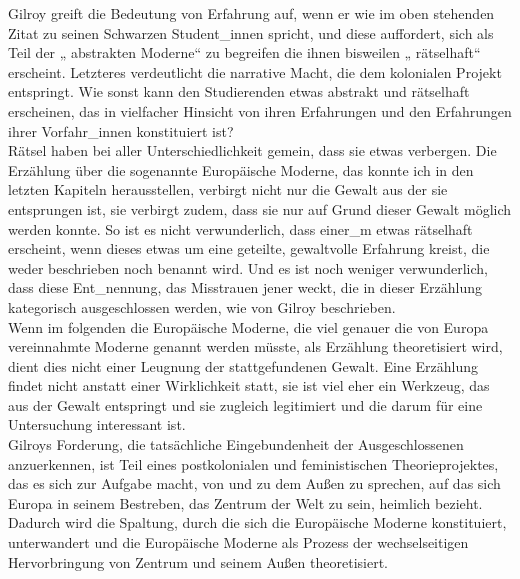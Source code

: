 Gilroy greift die Bedeutung von Erfahrung auf, wenn er wie im oben stehenden
Zitat zu seinen Schwarzen Student\_innen spricht, und diese auffordert, sich als
Teil der „ abstrakten Moderne“\footnotemark {} zu begreifen die ihnen bisweilen „ rätselhaft“\footnotemark {}
erscheint. Letzteres verdeutlicht die narrative Macht, die dem kolonialen
Projekt entspringt. Wie sonst kann den Studierenden etwas abstrakt und
rätselhaft erscheinen, das in vielfacher Hinsicht von ihren Erfahrungen und den
Erfahrungen ihrer Vorfahr\_innen konstituiert ist?\\ 
Rätsel haben bei aller Unterschiedlichkeit gemein, dass sie etwas verbergen.
Die Erzählung über die sogenannte Europäische Moderne, das konnte ich in den
letzten Kapiteln herausstellen, verbirgt nicht nur die Gewalt aus der sie
entsprungen ist, sie verbirgt zudem, dass sie nur auf Grund dieser Gewalt
möglich werden konnte. So ist es nicht verwunderlich, dass einer\_m etwas
rätselhaft erscheint, wenn dieses etwas um eine geteilte, gewaltvolle Erfahrung
kreist, die weder beschrieben noch benannt wird. Und es ist noch weniger
verwunderlich, dass diese Ent\_nennung, das Misstrauen jener weckt, die in
dieser Erzählung kategorisch ausgeschlossen werden, wie von Gilroy beschrieben.\\
Wenn im folgenden die Europäische Moderne, die viel genauer die von Europa
vereinnahmte Moderne genannt werden müsste, als Erzählung theoretisiert wird,
dient dies nicht einer Leugnung der stattgefundenen Gewalt. Eine Erzählung
findet nicht anstatt einer Wirklichkeit statt, sie ist viel eher ein Werkzeug,
das aus der Gewalt entspringt und sie zugleich legitimiert und die darum für
eine Untersuchung interessant ist.\footnotemark {}\\

\noindent Gilroys Forderung, die tatsächliche Eingebundenheit der Ausgeschlossenen
anzuerkennen, ist Teil eines postkolonialen und feministischen
Theorieprojektes, das es sich zur Aufgabe macht, von und zu dem Außen zu
sprechen, auf das sich Europa in seinem Bestreben, das Zentrum der Welt zu
sein, heimlich bezieht. \\
Dadurch wird die Spaltung, durch die sich die
Europäische Moderne konstituiert, unterwandert und die Europäische Moderne als
Prozess der wechselseitigen Hervorbringung von Zentrum und seinem Außen
theoretisiert.\\ 

